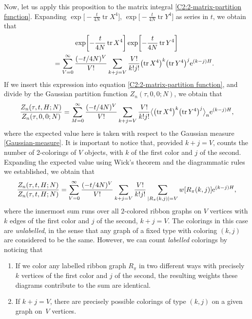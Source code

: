 \documentclass[10pt,a4paper]{amsart}
\DeclareMathOperator{\tr}{tr}
\numberwithin{equation}{section}
\begin{document}
Now, let us apply this proposition to the matrix integral \eqref{C2:2-matrix-partition function}.
Expanding $\exp \bigl[-\frac{t}{4N} \tr X^4 \bigr]$, $\exp \bigl[-\frac{t}{4N} \tr Y^4 \bigr]$ as series in $t$, we obtain that
 \begin{gather*}
 \exp \biggl[-\frac{t}{4N} \tr X^4 \biggr]\exp \biggl[-\frac{t}{4N} \tr Y^4 \biggr]\\
 \qquad{}= \sum_{V = 0}^{\infty}\frac{(-t/4N)^V}{V!}\sum_{k+j = V} \frac{V!}{k!j!} \bigl(\tr X^4\bigr)^k \bigl(\tr Y^4\bigr)^j {\rm e}^{(k-j)H}.
 \end{gather*}
If we insert this expression into equation \eqref{C2:2-matrix-partition function}, and divide by the Gaussian partition function
$Z_n(\tau,0,0;N)$, we obtain that
 \begin{equation*}
 \frac{Z_n(\tau,t,H;N)}{Z_n(\tau,0,0;N)} = \sum_{M = 0}^{\infty}\frac{(-t/4N)^V}{V!}\sum_{k+j = V} \frac{V!}{k!j!} \bigl\langle \bigl(\tr X^4\bigr)^k \bigl(\tr Y^4\bigr)^j \bigr\rangle_n {\rm e}^{(k-j)H},
 \end{equation*}
where the expected value here is taken with respect to the Gaussian measure \eqref{Gaussian-measure}.
It is important to notice that, provided $k+j = V$,  counts the number of 2-colorings of $V$ objects, with $k$ of the first color
and $j$ of the second. Expanding the expected value \smash{$\bigl\langle \bigl(\tr X^4\bigr)^k \bigl(\tr Y^4\bigr)^j \bigr\rangle_n$} using Wick's theorem and the diagrammatic rules
we established, we obtain that
 \begin{equation*}
 \frac{Z_n(\tau,t,H;N)}{Z_n(\tau,t,H;N)} = \sum_{V = 0}^{\infty}\frac{(-t/4N)^V}{V!}\sum_{k+j = V} \frac{V!}{k!j!} \sum_{|R_{\pi}(k,j)| = V} w [R_{\pi}(k,j)]{\rm e}^{(k-j)H},
 \end{equation*}
where the innermost sum runs over all $2$-colored ribbon graphs on $V$ vertices with $k$ edges of the first color and $j$ of the second, $k+j = V$.
The colorings in this case are \textit{unlabelled}, in the sense that any graph of a fixed type with coloring $(k,j)$ are considered to be the same.
However, we can count \textit{labelled} colorings by noticing that
 \begin{enumerate}\itemsep=0pt
 \item[$(1)$] If we color any labelled ribbon graph $R_{\pi}$ in two different ways with precisely $k$ vertices of the first color and $j$ of the second, the resulting weights these diagrams contribute to the sum are identical.
 \item[$(2)$] If $k+j = V$, there are precisely  possible colorings of type $(k,j)$ on a given graph on~$V$ vertices.
 \end{enumerate}
\end{document}
